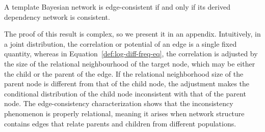 \documentclass[runningheads,a4paper]{llncs}
\begin{document}
\begin{theorem}\label{th:consistent-dn}
A template Bayesian network is edge-consistent if and only if its derived dependency network is consistent.
\end{theorem}

%
%

The proof of this result is complex, so we present it in an appendix. Intuitively, in a joint distribution, the correlation or potential of an edge 
is a single fixed quantity, whereas in Equation~\eqref{def:log-diff-freq-eq}, the correlation is adjusted by the size of the relational neighbourhood  of the target node, which may be either the child or the parent of the edge. If the relational neighborhood size of the parent node is different from that of the child node, the adjustment makes the conditional distribution of the child node inconsistent with that of the parent node. The edge-consistency characterization shows that the inconsistency phenomenon is properly relational, meaning it arises when network structure contains edges that relate parents and children from different populations.

%
\end{document}
